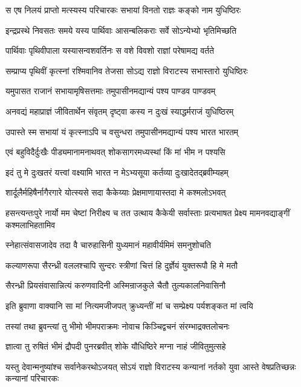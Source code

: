 \twolineshloka
{स एष निलयं प्राप्तो मत्स्यस्य परिचारकः}
{सभायां विनतो राज्ञः कङ्को नाम युधिष्ठिरः}


\twolineshloka
{इन्द्रप्रस्थे निवसतः समये यस्य पार्थिवाः}
{आसन्बलिकराः सर्वे सोऽन्येभ्यो भृतिमिच्छति}


\twolineshloka
{पार्थिवाः पृथिवीपाला यस्यासन्वशवर्तिनः}
{स वशे विवशो राज्ञां परेषामद्य वर्तते}


\twolineshloka
{सम्प्राप्य पृथिवीं कृत्स्नां रश्मिवानिव तेजसा}
{सोऽद्य राज्ञो विराटस्य सभास्तारो युधिष्ठिरः}


\twolineshloka
{यमुपासत राजानं सभायामृषिसत्तमाः}
{तमुपासीनमद्यान्यं पश्य पाण्डव पाण्डवम्}


\twolineshloka
{अनवद्यं महाप्राज्ञं जीवितार्थेन संवृतम्}
{दृष्ट्वा कस्य न दुःखं स्याद्धर्मराजं युधिष्ठिरम्}


\twolineshloka
{उपास्ते स्म सभायां यं कृत्स्नाऽपि च वसुन्धरा}
{तमुपासीनमद्यान्यं पश्य भारत भारतम्}


\twolineshloka
{एवं बहुविदैर्दुःखैः पीड्यमानामनाथवत्}
{शोकसागरमध्यस्थां किं मां भीम न पश्यसि}


\twolineshloka
{इदं तु मे दुःखतरं यत्त्वां वक्ष्यामि भारत}
{न मेऽभ्यसूया कर्तव्या दुःखादेतद्ब्रवीम्यहम्}


\twolineshloka
{शार्दूलैर्महिषैर्नागैरगारे योत्स्यसे सदा}
{कैकेय्याः प्रेक्षमाणायास्तदा मे कश्मलोऽभवत्}


\onelineshloka
{हसन्त्यन्तःपुरे नार्यो मम चेष्टां निरीक्ष्य च}
\twolineshloka
{तत उत्थाय कैकेयी सर्वास्ताः प्रत्यभाषत}
{प्रेक्ष्य मामनवद्याङ्गीं कश्मलाभिहतामिव}


\twolineshloka
{स्नेहात्संवासजादेव तदा वै चारुहासिनी}
{युध्यमानं महावीर्यमिमं समनुशोचति}


\twolineshloka
{कल्याणरूपा सैरन्ध्री वललश्चापि सुन्दरः}
{स्त्रीणां चित्तं हि दुर्ज्ञेयं युक्तरूपौ हि मे मतौ}


\twolineshloka
{सैरन्ध्री प्रियसंवासान्नित्यं करुणवादिनी}
{अस्मिन्राजकुले चैतौ तुल्यकालनिवासिनौ}


\twolineshloka
{इति ब्रुवाणा वाक्यानि सा मां नित्यमजीजपत्}
{क्रुध्यन्तीं मां च सम्प्रेक्ष्य पर्यशङ्कत मां त्वयि}


\twolineshloka
{तस्यां तथा ब्रुवन्त्यां तु भीमो भीमपराक्रमः}
{नोवाच किञ्चिद्वचनं संरम्भाद्रक्तलोचनः}


\twolineshloka
{ज्ञात्वा तु रुषितं भीमं द्रौपदी पुनरब्रवीत्}
{शोके यौधिष्ठिरे मग्ना नाहं जीवितुमुत्सहे}


\threelineshloka
{यस्तु देवान्मनुष्यांश्च सर्वानेकरथोऽजयत्}
{सोऽयं राज्ञो विराटस्य कन्यानां नर्तको युवा}
{आस्ते वेषप्रतिच्छन्नः कन्यानां परिचारकः}


